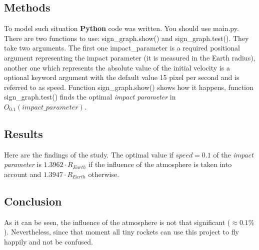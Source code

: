 \documentclass[a4paper,12pt]{article}
\begin{document}
\subsection*{Methods}
To model such situation \textbf{Python} code was written. You should use
\colorbox{gray!30}{main.py}. There are two functions to use:
\colorbox{gray!30}{sign\_graph.show()} and 
\colorbox{gray!30}{sign\_graph.test()}. They take two arguments.
The first one \colorbox{gray!30}{impact\_parameter} is a required positional
argument representing the impact parameter (it is measured in the 
Earth radius), another one which represents the absolute value of the
initial velocity is a optional keyword argument with the default value 15 pixel 
per second and is referred to as \colorbox{gray!30}{speed}. 
Function \colorbox{gray!30}{sign\_graph.show()} shows how it happens, 
function \colorbox{gray!30}{sign\_graph.test()} finds the optimal 
\textit{impact parameter} in \textit{$O_{0.1}(impact\_parameter)$}.
\subsection*{Results}
Here are the findings of the study. The optimal value if $\textit{speed} = 0.1$ of the \textit{impact parameter} 
is $1.3962 \cdot R_{Earth}$ if the influence of the atmosphere is taken into account 
and $1.3947 \cdot R_{Earth}$ otherwise.
\subsection*{Conclusion}
As it can be seen, the influence of the atmosphere is not that significant 
($\approx 0.1\%$). Nevertheless, since that moment all tiny rockets can 
use this project to fly happily and not be confused.
\end{document}
